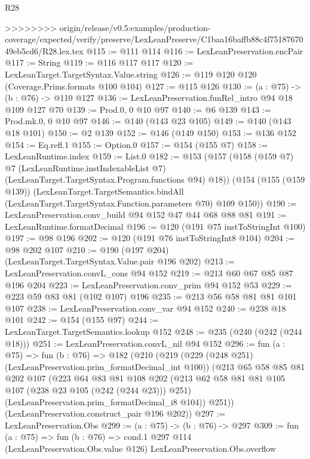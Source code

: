 \begin{lexlean}{R28}
\begin{coremodule}
{{{{{>>>>>>>> origin/release/v0.5:examples/production-coverage/expected/verify/preserve/LexLeanPreserve/C1baa16baffb88c4f7518767049eb5cd6/R28.lex.tex
@115 := @111 @114
@116 := LexLeanPreservation.encPair
@117 := String
@119 := @116 @117 @117
@120 := LexLeanTarget.TargetSyntax.Value.string
@126 := @119 @120 @120 (Coverage.Prims.formats @100 @104)
@127 := @115 @126
@130 := (a : @75) -> (b : @76) -> @110 @127
@136 := LexLeanPreservation.funRel_intro @94 @18 @109 @127 @70
@139 := Prod.{0, 0} @10 @97
@140 := @6 @139
@143 := Prod.mk.{0, 0} @10 @97
@146 := @140 (@143 @23 @105)
@149 := @140 (@143 @18 @101)
@150 := @2 @139
@152 := @146 (@149 @150)
@153 := @136 @152
@154 := Eq.refl.{1}
@155 := Option.{0}
@157 := @154 (@155 @7)
@158 := LexLeanRuntime.index
@159 := List.{0}
@182 := @153
    (@157
      (@158
        (@159 @7)
        @7
        (LexLeanRuntime.instIndexableList @7)
        (LexLeanTarget.TargetSyntax.Program.functions @94)
        @18))
    (@154
      (@155 (@159 @139))
      (LexLeanTarget.TargetSemantics.bindAll
        (LexLeanTarget.TargetSyntax.Function.parameters @70)
        @109
        @150))
@190 := LexLeanPreservation.conv_build @94 @152 @47 @44 @68 @88 @81
@191 := LexLeanRuntime.formatDecimal
@196 := @120 (@191 @75 instToStringInt @100)
@197 := @98 @196
@202 := @120 (@191 @76 instToStringInt8 @104)
@204 := @98 @202 @107
@210 := @190 (@197 @204) (LexLeanTarget.TargetSyntax.Value.pair @196 @202)
@213 := LexLeanPreservation.convL_cons @94 @152
@219 := @213 @60 @67 @85 @87 @196 @204
@223 := LexLeanPreservation.conv_prim @94 @152 @53
@229 := @223 @59 @83 @81 (@102 @107) @196
@235 := @213 @56 @58 @81 @81 @101 @107
@238 := LexLeanPreservation.conv_var @94 @152
@240 := @238 @18 @101
@242 := @154 (@155 @97)
@244 := LexLeanTarget.TargetSemantics.lookup @152
@248 := @235 (@240 (@242 (@244 @18)))
@251 := LexLeanPreservation.convL_nil @94 @152
@296 := fun (a : @75) =>
  fun (b : @76) =>
  @182
    (@210
      (@219
        (@229 (@248 @251) (LexLeanPreservation.prim_formatDecimal_int @100))
        (@213
          @65
          @58
          @85
          @81
          @202
          @107
          (@223
            @64
            @83
            @81
            @108
            @202
            (@213 @62 @58 @81 @81 @105 @107 (@238 @23 @105 (@242 (@244 @23))) @251)
            (LexLeanPreservation.prim_formatDecimal_i8 @104))
          @251))
      (LexLeanPreservation.construct_pair @196 @202))
@297 := LexLeanPreservation.Obs
@299 := (a : @75) -> (b : @76) -> @297
@309 := fun (a : @75) =>
  fun (b : @76) =>
  cond.{1} @297 @114 (LexLeanPreservation.Obs.value @126) LexLeanPreservation.Obs.overflow
}}}}}
\end{coremodule}
\end{lexlean}
